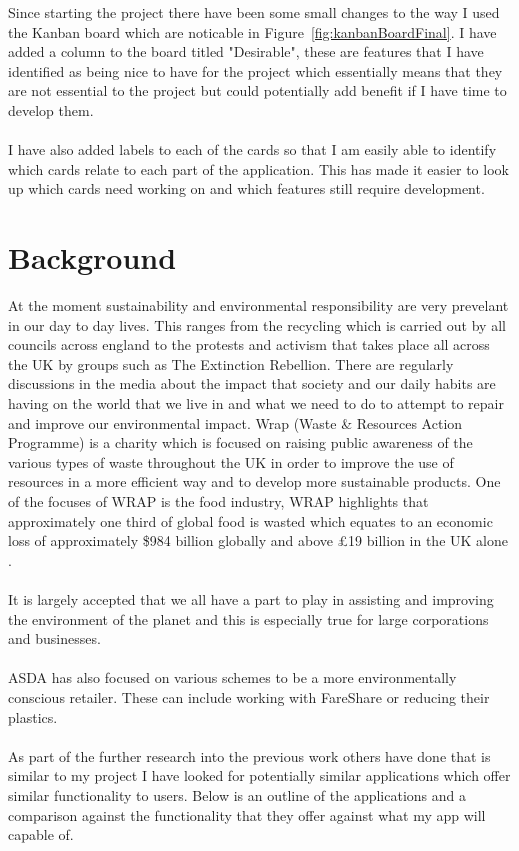 \documentclass[a4paper,11pt]{report}
\begin{document}
Since starting the project there have been some small changes to the way I used the Kanban board which are noticable in Figure~\ref{fig:kanbanBoardFinal}.
I have added a column to the board titled "Desirable", these are features that I have identified as being nice to have for the
project which essentially means that they are not essential to the project but could potentially add benefit if I have time to develop them.
\\
\\
I have also added labels to each of the cards so that I am easily able to identify which cards relate to each part of the application.
This has made it easier to look up which cards need working on and which features still require development. 



\chapter{Background}

At the moment sustainability and environmental responsibility are very prevelant in our day
to day lives. This ranges from the recycling which is carried out by all councils across
england to the protests and activism that takes place all across the UK by groups such 
as The Extinction Rebellion. There are regularly discussions in the media about the impact
that society and our daily habits are having on the world that we live in and what we need
to do to attempt to repair and improve our environmental impact. Wrap (Waste \& Resources Action Programme) \cite{wrapvision}
is a charity which is focused on raising public awareness of the various types of waste throughout the UK
in order to improve the use of resources in a more efficient way and to develop more sustainable products.
One of the focuses of WRAP is the food industry, WRAP highlights that approximately one third of global food
is wasted which equates to an economic loss of approximately \$984 billion globally and above £19 billion in the UK alone \cite{wrap-food-drink}.
\\
\\
It is largely accepted that we all have a part to play in assisting and improving the environment
of the planet and this is especially true for large corporations and businesses. 
\\
\\
ASDA has also focused on various schemes to be a more environmentally conscious retailer. 
These can include working with FareShare \cite{asda-food-waste} or reducing their plastics. 
\\ 
\\  
As part of the further research into the previous work others have done that is similar to my project 
I have looked for potentially similar applications which offer similar functionality to users. 
Below is an outline of the applications and a comparison against the functionality that they
offer against what my app will capable of.
\end{document}
